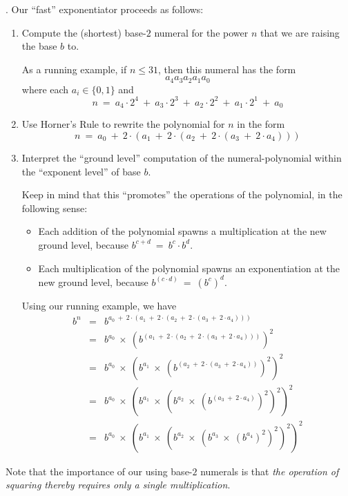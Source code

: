 .
Our ``fast'' exponentiator proceeds as follows:
\begin{enumerate}
\item
Compute the (shortest) base-$2$ numeral for the power $n$ that we are raising the base $b$ to.

\smallskip

As a running example, if $n \leq 31$, then this numeral has the form
\[ a_4 a_3 a_2 a_1 a_0 \]
where each $a_i \in \{0,1\}$ and
\[ n \ = \
a_4 \cdot 2^4 \ + \  a_3 \cdot 2^3 \ + \  a_2 \cdot 2^2 \ + \  a_1 \cdot 2^1 \ + \ a_0
\] 

\medskip\item
Use Horner's Rule to rewrite the polynomial for $n$ in the form
\[ n \ = \
a_0 \ + \ 2 \cdot (a_1 \ + \ 2 \cdot (a_2 \ + \ 2 \cdot (a_3 \ + \ 2 \cdot a_4 ))) \]

\medskip\item
Interpret the ``ground level'' computation of the numeral-polynomial within the ``exponent level'' of base $b$.

\smallskip

Keep in mind that this ``promotes'' the operations of the polynomial, in the following sense:
\begin{itemize}
\item
Each addition of the polynomial spawns a multiplication at the new ground level, because $b^{c + d} \ = \ b^c \cdot b^d$.
\medskip\item
Each multiplication of the polynomial spawns an exponentiation at the new ground level, because $b^{(c \cdot d)} \ = \ (b^c)^d$.
\end{itemize}

\smallskip

Using our running example, we have
\begin{eqnarray*}
b^n & = &
 b^{a_0 \ + \ 2 \cdot (a_1 \ + \ 2 \cdot (a_2 \ + \ 2 \cdot (a_3 \ + \
          2 \cdot a_4 )))} \\
    & = &
 b^{a_0} \ \times \ 
\left( b^{
(a_1 \ + \ 2 \cdot (a_2 \ + \ 2 \cdot (a_3 \ + \ 2 \cdot a_4 )))}
\right)^2 \\
    & = &
 b^{a_0} \ \times \
\left(
b^{a_1}  \ \times \
\left(
b^{(a_2 \ + \ 2 \cdot (a_3 \ + \ 2 \cdot a_4 ))}
\right)^2
\right)^2 \\
    & = &
b^{a_0} \ \times \
\left(
b^{a_1}  \ \times \
\left(
b^{a_2}  \ \times \
\left(
b^{(a_3 \ + \ 2 \cdot a_4 )}
\right)^2
\right)^2
\right)^2 \\
    & = &
b^{a_0} \ \times \
\left(
b^{a_1}  \ \times \
\left(
b^{a_2}  \ \times \
\left(
b^{a_3}  \ \times \
\left(
b^{a_4}
\right)^2
\right)^2
\right)^2
\right)^2
\end{eqnarray*}
\end{enumerate}
Note that the importance of our using base-$2$ numerals is that {\em the operation of squaring thereby requires only a single multiplication}.

